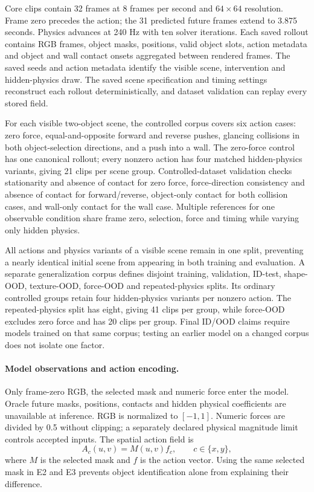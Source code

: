 \documentclass[11pt,a4paper]{article}
\begin{document}
Core clips contain 32 frames at 8 frames per second and $64\times64$ resolution. Frame zero precedes the action; the 31 predicted future frames extend to 3.875 seconds. Physics advances at 240 Hz with ten solver iterations. Each saved rollout contains RGB frames, object masks, positions, valid object slots, action metadata and object and wall contact onsets aggregated between rendered frames. The saved seeds and action metadata identify the visible scene, intervention and hidden-physics draw. The saved scene specification and timing settings reconstruct each rollout deterministically, and dataset validation can replay every stored field.

For each visible two-object scene, the controlled corpus covers six action cases: zero force, equal-and-opposite forward and reverse pushes, glancing collisions in both object-selection directions, and a push into a wall. The zero-force control has one canonical rollout; every nonzero action has four matched hidden-physics variants, giving 21 clips per scene group. Controlled-dataset validation checks stationarity and absence of contact for zero force, force-direction consistency and absence of contact for forward/reverse, object-only contact for both collision cases, and wall-only contact for the wall case. Multiple references for one observable condition share frame zero, selection, force and timing while varying only hidden physics.

All actions and physics variants of a visible scene remain in one split, preventing a nearly identical initial scene from appearing in both training and evaluation. A separate generalization corpus defines disjoint training, validation, ID-test, shape-OOD, texture-OOD, force-OOD and repeated-physics splits. Its ordinary controlled groups retain four hidden-physics variants per nonzero action. The repeated-physics split has eight, giving 41 clips per group, while force-OOD excludes zero force and has 20 clips per group. Final ID/OOD claims require models trained on that same corpus; testing an earlier model on a changed corpus does not isolate one factor.

\paragraph{Model observations and action encoding.}
Only frame-zero RGB, the selected mask and numeric force enter the model. Oracle future masks, positions, contacts and hidden physical coefficients are unavailable at inference. RGB is normalized to $[-1,1]$. Numeric forces are divided by 0.5 without clipping; a separately declared physical magnitude limit controls accepted inputs. The spatial action field is
\[
 A_c(u,v)=M(u,v)f_c,\qquad c\in\{x,y\},
\]
where $M$ is the selected mask and $f$ is the action vector. Using the same selected mask in E2 and E3 prevents object identification alone from explaining their difference.
\end{document}
